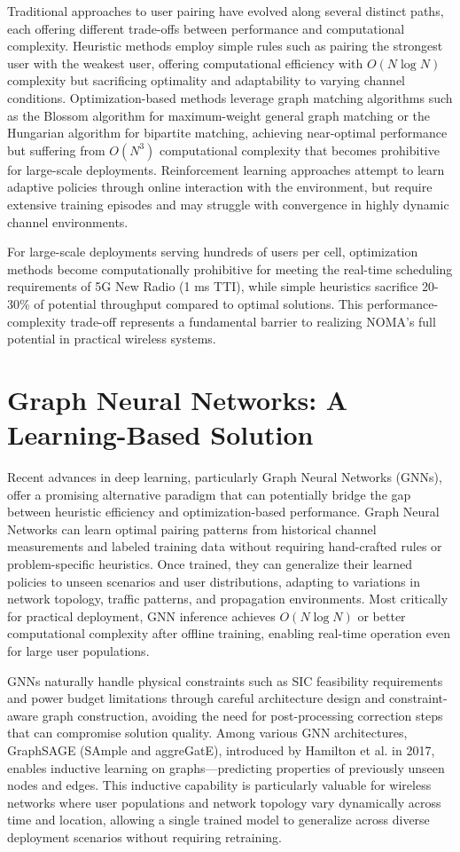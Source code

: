 Traditional approaches to user pairing have evolved along several distinct paths, each offering different trade-offs between performance and computational complexity. Heuristic methods employ simple rules such as pairing the strongest user with the weakest user, offering computational efficiency with $O(N \log N)$ complexity but sacrificing optimality and adaptability to varying channel conditions. Optimization-based methods leverage graph matching algorithms such as the Blossom algorithm for maximum-weight general graph matching or the Hungarian algorithm for bipartite matching, achieving near-optimal performance but suffering from $O(N^3)$ computational complexity that becomes prohibitive for large-scale deployments. Reinforcement learning approaches attempt to learn adaptive policies through online interaction with the environment, but require extensive training episodes and may struggle with convergence in highly dynamic channel environments.

For large-scale deployments serving hundreds of users per cell, optimization methods become computationally prohibitive for meeting the real-time scheduling requirements of 5G New Radio (1 ms TTI), while simple heuristics sacrifice 20-30\% of potential throughput compared to optimal solutions. This performance-complexity trade-off represents a fundamental barrier to realizing NOMA's full potential in practical wireless systems.

\section{Graph Neural Networks: A Learning-Based Solution}

Recent advances in deep learning, particularly Graph Neural Networks (GNNs), offer a promising alternative paradigm that can potentially bridge the gap between heuristic efficiency and optimization-based performance. Graph Neural Networks can learn optimal pairing patterns from historical channel measurements and labeled training data without requiring hand-crafted rules or problem-specific heuristics. Once trained, they can generalize their learned policies to unseen scenarios and user distributions, adapting to variations in network topology, traffic patterns, and propagation environments. Most critically for practical deployment, GNN inference achieves $O(N \log N)$ or better computational complexity after offline training, enabling real-time operation even for large user populations.

GNNs naturally handle physical constraints such as SIC feasibility requirements and power budget limitations through careful architecture design and constraint-aware graph construction, avoiding the need for post-processing correction steps that can compromise solution quality. Among various GNN architectures, GraphSAGE (SAmple and aggreGatE), introduced by Hamilton et al. in 2017, enables inductive learning on graphs—predicting properties of previously unseen nodes and edges. This inductive capability is particularly valuable for wireless networks where user populations and network topology vary dynamically across time and location, allowing a single trained model to generalize across diverse deployment scenarios without requiring retraining.

